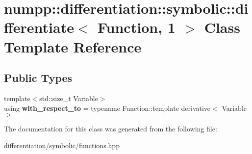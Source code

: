 \hypertarget{classnumpp_1_1differentiation_1_1symbolic_1_1differentiate_3_01Function_00_011_01_4}{}\section{numpp\+:\+:differentiation\+:\+:symbolic\+:\+:differentiate$<$ Function, 1 $>$ Class Template Reference}
\label{classnumpp_1_1differentiation_1_1symbolic_1_1differentiate_3_01Function_00_011_01_4}
\subsection*{Public Types}
\begin{DoxyCompactItemize}
\item 
\mbox{\label{classnumpp_1_1differentiation_1_1symbolic_1_1differentiate_3_01Function_00_011_01_4_af210780c9adc4170d3924f92fde40db3}} 
{\footnotesize template$<$std\+::size\+\_\+t Variable$>$ }\\using {\bfseries with\+\_\+respect\+\_\+to} = typename Function\+::template derivative$<$ Variable $>$
\end{DoxyCompactItemize}


The documentation for this class was generated from the following file\+:\begin{DoxyCompactItemize}
\item 
differentiation/symbolic/functions.\+hpp\end{DoxyCompactItemize}
